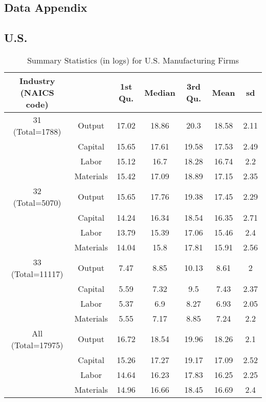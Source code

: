 \documentclass[12pt]{article}
\begin{document}
\begin{appendices}
\section{Data Appendix}\label{data}
\subsection{U.S.} \label{USdata}

\begin{table}[H]
\centering
\caption{Summary Statistics (in logs) for U.S. Manufacturing Firms}
\small
\begin{tabular}{ccccccc}
  \hline\hline Industry (NAICS code) &   & 1st Qu. & Median & 3rd Qu. & Mean & sd \\ 
  \hline
31 (Total=1788) & Output & 17.02 & 18.86 & 20.3 & 18.58 & 2.11 \\ 
   & Capital & 15.65 & 17.61 & 19.58 & 17.53 & 2.49 \\ 
   & Labor & 15.12 & 16.7 & 18.28 & 16.74 & 2.2 \\ 
   & Materials & 15.42 & 17.09 & 18.89 & 17.15 & 2.35 \\ 
  32 (Total=5070) & Output & 15.65 & 17.76 & 19.38 & 17.45 & 2.29 \\ 
   & Capital & 14.24 & 16.34 & 18.54 & 16.35 & 2.71 \\ 
   & Labor & 13.79 & 15.39 & 17.06 & 15.46 & 2.4 \\ 
   & Materials & 14.04 & 15.8 & 17.81 & 15.91 & 2.56 \\ 
  33 (Total=11117) & Output & 7.47 & 8.85 & 10.13 & 8.61 & 2 \\ 
   & Capital & 5.59 & 7.32 & 9.5 & 7.43 & 2.37 \\ 
   & Labor & 5.37 & 6.9 & 8.27 & 6.93 & 2.05 \\ 
   & Materials & 5.55 & 7.17 & 8.85 & 7.24 & 2.2 \\ 
  All (Total=17975) & Output & 16.72 & 18.54 & 19.96 & 18.26 & 2.1 \\ 
   & Capital & 15.26 & 17.27 & 19.17 & 17.09 & 2.52 \\ 
   & Labor & 14.64 & 16.23 & 17.83 & 16.25 & 2.25 \\ 
   & Materials & 14.96 & 16.66 & 18.45 & 16.69 & 2.4 \\ 
   \hline
\end{tabular}
\label{USsum}
\end{table}


\end{appendices}
\end{document}

